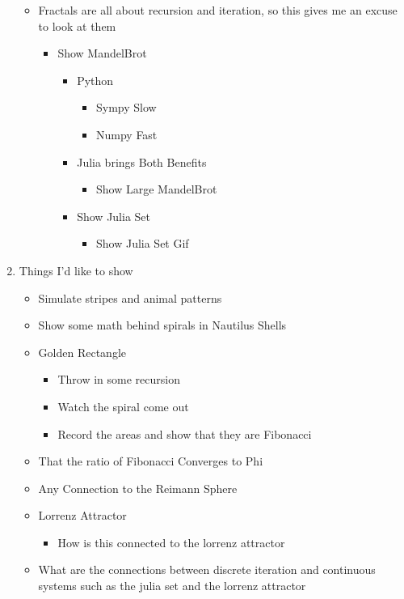 \documentclass[11pt]{article}
\begin{document}
\begin{enumerate}
\begin{itemize}
\item Fractals are all about recursion and iteration, so this gives me an excuse to look at them
\begin{itemize}
\item Show MandelBrot
\begin{itemize}
\item Python
\begin{itemize}
\item Sympy Slow
\item Numpy Fast
\end{itemize}
\item Julia brings Both Benefits
\begin{itemize}
\item Show Large MandelBrot
\end{itemize}
\item Show Julia Set
\begin{itemize}
\item Show Julia Set Gif
\end{itemize}
\end{itemize}
\end{itemize}
\end{itemize}
\item Things I'd like to show
\begin{itemize}
\item Simulate stripes and animal patterns
\item Show some math behind spirals in Nautilus Shells
\item Golden Rectangle
\begin{itemize}
\item Throw in some recursion
\item Watch the spiral come out
\item Record the areas and show that they are Fibonacci
\end{itemize}
\item That the ratio of Fibonacci Converges to Phi
\item Any Connection to the Reimann Sphere
\item Lorrenz Attractor
\begin{itemize}
\item How is this connected to the lorrenz attractor
\end{itemize}
\item What are the connections between discrete iteration and continuous systems such as the julia set and the lorrenz attractor
\end{itemize}

\end{enumerate}
\end{document}
